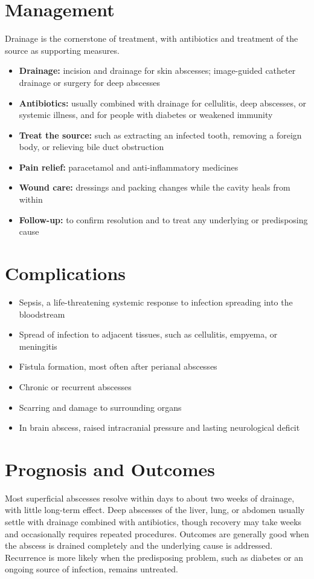 \section*{Management}
Drainage is the cornerstone of treatment, with antibiotics and treatment of the source as supporting measures.

\begin{itemize}
    \item \textbf{Drainage:} incision and drainage for skin abscesses; image-guided catheter drainage or surgery for deep abscesses
    \item \textbf{Antibiotics:} usually combined with drainage for cellulitis, deep abscesses, or systemic illness, and for people with diabetes or weakened immunity
    \item \textbf{Treat the source:} such as extracting an infected tooth, removing a foreign body, or relieving bile duct obstruction
    \item \textbf{Pain relief:} paracetamol and anti-inflammatory medicines
    \item \textbf{Wound care:} dressings and packing changes while the cavity heals from within
    \item \textbf{Follow-up:} to confirm resolution and to treat any underlying or predisposing cause
\end{itemize}

\section*{Complications}
\begin{itemize}
    \item Sepsis, a life-threatening systemic response to infection spreading into the bloodstream
    \item Spread of infection to adjacent tissues, such as cellulitis, empyema, or meningitis
    \item Fistula formation, most often after perianal abscesses
    \item Chronic or recurrent abscesses
    \item Scarring and damage to surrounding organs
    \item In brain abscess, raised intracranial pressure and lasting neurological deficit
\end{itemize}

\section*{Prognosis and Outcomes}
Most superficial abscesses resolve within days to about two weeks of drainage, with little long-term effect. Deep abscesses of the liver, lung, or abdomen usually settle with drainage combined with antibiotics, though recovery may take weeks and occasionally requires repeated procedures. Outcomes are generally good when the abscess is drained completely and the underlying cause is addressed. Recurrence is more likely when the predisposing problem, such as diabetes or an ongoing source of infection, remains untreated.

